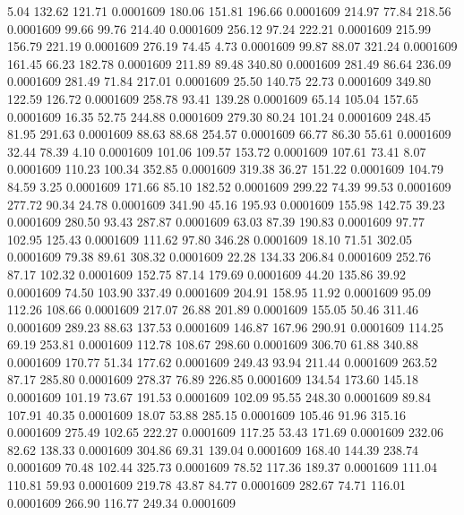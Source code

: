    5.04  132.62  121.71   0.0001609
 180.06  151.81  196.66   0.0001609
 214.97   77.84  218.56   0.0001609
  99.66   99.76  214.40   0.0001609
 256.12   97.24  222.21   0.0001609
 215.99  156.79  221.19   0.0001609
 276.19   74.45    4.73   0.0001609
  99.87   88.07  321.24   0.0001609
 161.45   66.23  182.78   0.0001609
 211.89   89.48  340.80   0.0001609
 281.49   86.64  236.09   0.0001609
 281.49   71.84  217.01   0.0001609
  25.50  140.75   22.73   0.0001609
 349.80  122.59  126.72   0.0001609
 258.78   93.41  139.28   0.0001609
  65.14  105.04  157.65   0.0001609
  16.35   52.75  244.88   0.0001609
 279.30   80.24  101.24   0.0001609
 248.45   81.95  291.63   0.0001609
  88.63   88.68  254.57   0.0001609
  66.77   86.30   55.61   0.0001609
  32.44   78.39    4.10   0.0001609
 101.06  109.57  153.72   0.0001609
 107.61   73.41    8.07   0.0001609
 110.23  100.34  352.85   0.0001609
 319.38   36.27  151.22   0.0001609
 104.79   84.59    3.25   0.0001609
 171.66   85.10  182.52   0.0001609
 299.22   74.39   99.53   0.0001609
 277.72   90.34   24.78   0.0001609
 341.90   45.16  195.93   0.0001609
 155.98  142.75   39.23   0.0001609
 280.50   93.43  287.87   0.0001609
  63.03   87.39  190.83   0.0001609
  97.77  102.95  125.43   0.0001609
 111.62   97.80  346.28   0.0001609
  18.10   71.51  302.05   0.0001609
  79.38   89.61  308.32   0.0001609
  22.28  134.33  206.84   0.0001609
 252.76   87.17  102.32   0.0001609
 152.75   87.14  179.69   0.0001609
  44.20  135.86   39.92   0.0001609
  74.50  103.90  337.49   0.0001609
 204.91  158.95   11.92   0.0001609
  95.09  112.26  108.66   0.0001609
 217.07   26.88  201.89   0.0001609
 155.05   50.46  311.46   0.0001609
 289.23   88.63  137.53   0.0001609
 146.87  167.96  290.91   0.0001609
 114.25   69.19  253.81   0.0001609
 112.78  108.67  298.60   0.0001609
 306.70   61.88  340.88   0.0001609
 170.77   51.34  177.62   0.0001609
 249.43   93.94  211.44   0.0001609
 263.52   87.17  285.80   0.0001609
 278.37   76.89  226.85   0.0001609
 134.54  173.60  145.18   0.0001609
 101.19   73.67  191.53   0.0001609
 102.09   95.55  248.30   0.0001609
  89.84  107.91   40.35   0.0001609
  18.07   53.88  285.15   0.0001609
 105.46   91.96  315.16   0.0001609
 275.49  102.65  222.27   0.0001609
 117.25   53.43  171.69   0.0001609
 232.06   82.62  138.33   0.0001609
 304.86   69.31  139.04   0.0001609
 168.40  144.39  238.74   0.0001609
  70.48  102.44  325.73   0.0001609
  78.52  117.36  189.37   0.0001609
 111.04  110.81   59.93   0.0001609
 219.78   43.87   84.77   0.0001609
 282.67   74.71  116.01   0.0001609
 266.90  116.77  249.34   0.0001609
